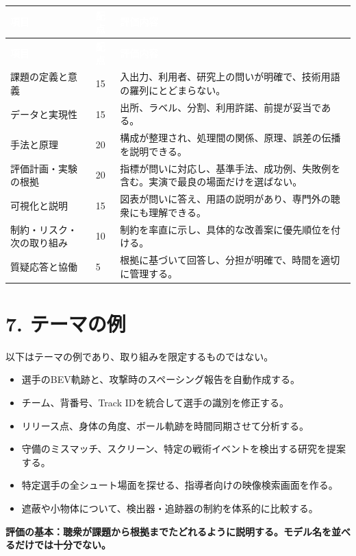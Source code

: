 \documentclass[11pt,a4paper]{article}
\begin{document}
\begin{xltabular}{\textwidth}{|Y|C{1.5cm}|Y|}\hline
{}\textcolor{white}{\textbf{項目}} & \textcolor{white}{\textbf{配点}} & \textcolor{white}{\textbf{評価内容}} \\ \hline
\endfirsthead
\hline
{}\textcolor{white}{\textbf{項目}} & \textcolor{white}{\textbf{配点}} & \textcolor{white}{\textbf{評価内容}} \\ \hline
\endhead
課題の定義と意義 & 15 & 入出力、利用者、研究上の問いが明確で、技術用語の羅列にとどまらない。 \\ \hline
データと実現性 & 15 & 出所、ラベル、分割、利用許諾、前提が妥当である。 \\ \hline
手法と原理 & 20 & 構成が整理され、処理間の関係、原理、誤差の伝播を説明できる。 \\ \hline
評価計画・実験の根拠 & 20 & 指標が問いに対応し、基準手法、成功例、失敗例を含む。実演で最良の場面だけを選ばない。 \\ \hline
可視化と説明 & 15 & 図表が問いに答え、用語の説明があり、専門外の聴衆にも理解できる。 \\ \hline
制約・リスク・次の取り組み & 10 & 制約を率直に示し、具体的な改善案に優先順位を付ける。 \\ \hline
質疑応答と協働 & 5 & 根拠に基づいて回答し、分担が明確で、時間を適切に管理する。 \\ \hline
\end{xltabular}

\section{7. テーマの例}

以下はテーマの例であり、取り組みを限定するものではない。

\begin{itemize}[leftmargin=1.6em,itemsep=3pt]
  \item 選手のBEV軌跡と、攻撃時のスペーシング報告を自動作成する。
  \item チーム、背番号、Track IDを統合して選手の識別を修正する。
  \item リリース点、身体の角度、ボール軌跡を時間同期させて分析する。
  \item 守備のミスマッチ、スクリーン、特定の戦術イベントを検出する研究を提案する。
  \item 特定選手の全シュート場面を探せる、指導者向けの映像検索画面を作る。
  \item 遮蔽や小物体について、検出器・追跡器の制約を体系的に比較する。
\end{itemize}

\vfill
\begin{center}
\small\textbf{評価の基本：聴衆が課題から根拠までたどれるように説明する。モデル名を並べるだけでは十分でない。}
\end{center}
\end{document}
